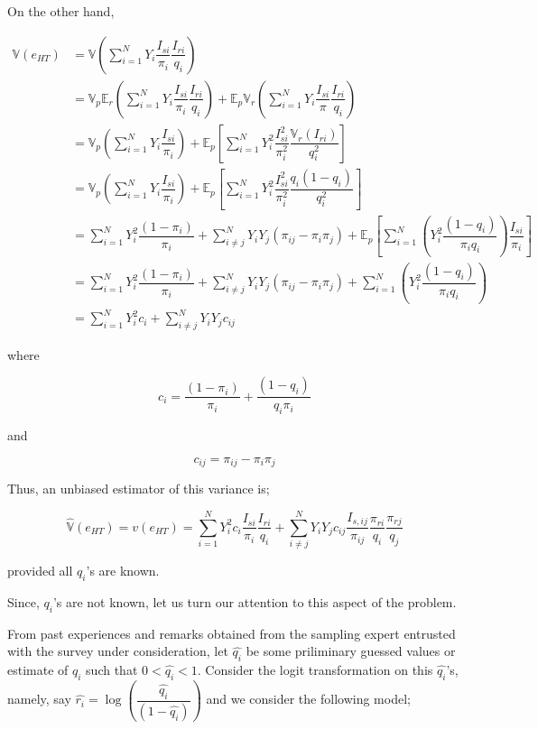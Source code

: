 \documentclass[12pt]{article}
\newcommand{\E}{\mathbb{E}}
\newcommand{\Var}{\mathbb{V}}
\theoremstyle{definition}
\begin{document}
On the other hand,

\begin{align*}
    \Var(e_{HT})
    & = \Var\left( \sum_{i=1}^{N} Y_i \dfrac{I_{si}}{\pi_i} \dfrac{I_{ri}}{q_i} \right)\\
    & = \Var_p\E_r\left( \sum_{i=1}^{N} Y_i \dfrac{I_{si}}{\pi_i} \dfrac{I_{ri}}{q_i} \right) + \E_p \Var_r\left( \sum_{i=1}^{N} Y_i \dfrac{I_{si}}{\pi} \dfrac{I_{ri}}{q_i} \right)\\
    & = \Var_p\left( \sum_{i=1}^{N} Y_i \dfrac{I_{si}}{\pi_i} \right) + \E_p\left[ \sum_{i=1}^{N} Y_i^2 \dfrac{I_{si}^2}{\pi_i^2} \dfrac{\Var_r(I_{ri})}{q_i^2} \right]\\
    & = \Var_p\left( \sum_{i=1}^{N} Y_i \dfrac{I_{si}}{\pi_i} \right) + \E_p\left[ \sum_{i=1}^{N} Y_i^2 \dfrac{I_{si}^2}{\pi_i^2} \dfrac{q_i(1-q_i)}{q_i^2} \right]\\
    & = \sum_{i=1}^{N} Y_i^2 \dfrac{(1 - \pi_i)}{\pi_i} + \sum_{i\neq j}^{N} Y_i Y_j (\pi_{ij} - \pi_i \pi_j) + \E_p\left[ \sum_{i=1}^{N} \left(Y_i^2\dfrac{(1-q_i)}{\pi_i q_i}\right) \dfrac{I_{si}}{\pi_i}  \right]\\
    & = \sum_{i=1}^{N} Y_i^2 \dfrac{(1 - \pi_i)}{\pi_i} + \sum_{i\neq j}^{N} Y_i Y_j (\pi_{ij} - \pi_i \pi_j) + \sum_{i=1}^{N} \left(Y_i^2\dfrac{(1-q_i)}{\pi_i q_i}\right)\\
    & = \sum_{i=1}^{N} Y_i^2 c_i + \sum_{i \neq j}^{N} Y_iY_jc_{ij}
\end{align*}

where 

$$c_i = \dfrac{(1 - \pi_i)}{\pi_i} + \dfrac{(1-q_i)}{q_i \pi_i}$$

and 

$$c_{ij} = \pi_{ij} - \pi_i \pi_j$$

Thus, an unbiased estimator of this variance is;

$$\widehat{\Var}(e_{HT}) = v(e_{HT}) = \sum_{i=1}^{N} Y_i^2 c_i \dfrac{I_{si}}{\pi_i} \dfrac{I_{ri}}{q_i} + \sum_{i \neq j}^{N} Y_iY_jc_{ij} \dfrac{I_{s,ij}}{\pi_{ij}} \dfrac{\pi_{ri}}{q_i} \dfrac{\pi_{rj}}{q_j}$$

provided all $q_i$'s are known.

Since, $q_i$'s are not known, let us turn our attention to this aspect of the problem.

From past experiences and remarks obtained from the sampling expert entrusted with the survey under consideration, let $\widehat{q_i}$ be some priliminary guessed values or estimate of $q_i$ such that $0 < \widehat{q_i} < 1$. Consider the logit transformation on this $\widehat{q_i}$'s, namely, say $\widehat{r_i} = \log\left( \dfrac{\widehat{q_i}}{(1 - \widehat{q_i})} \right)$ and we consider the following model;
\end{document}
